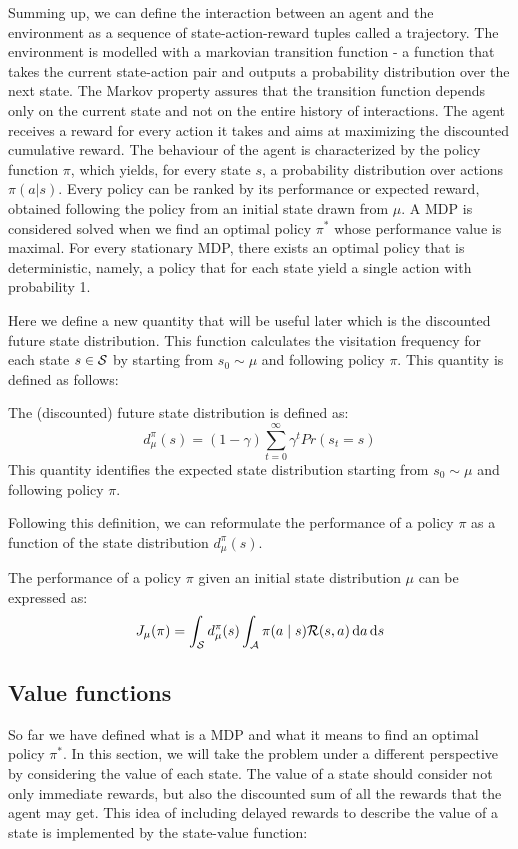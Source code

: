 Summing up, we can define the interaction between an agent and the environment as a sequence of state-action-reward tuples called a trajectory. The environment is modelled with a markovian transition function - a function that takes the current state-action pair and outputs a probability distribution over the next state. The Markov property assures that the transition function depends only on the current state and not on the entire history of interactions. The agent receives a reward for every action it takes and aims at maximizing the discounted cumulative reward. The behaviour of the agent is characterized by the policy function $\pi$, which yields, for every state $s$, a probability distribution over actions $\pi(a|s)$. Every policy can be ranked by its performance or expected reward, obtained following the policy from an initial state drawn from $\mu$. A MDP is considered solved when we find an optimal policy $\pi^*$ whose performance value is maximal. For every stationary MDP, there exists an optimal policy that is deterministic, namely, a policy that for each state yield a single action with probability 1.

Here we define a new quantity that will be useful later which is the discounted future state distribution. This function calculates the visitation frequency for each state $s\in\mathcal{S}$ by starting from $s_0\sim\mu$ and following policy $\pi$. This quantity is defined as follows:
\begin{definition}
The (discounted) future state distribution is defined as: 
\[
d_{\mu}^{\pi}(s) = (1-\gamma)\sum_{t=0}^{\infty} \gamma^t Pr(s_t = s)
\]
This quantity identifies the expected state distribution starting from $s_0 \sim \mu$ and following policy $\pi$. 
\end{definition}

Following this definition, we can reformulate the performance of a policy $\pi$ as a function of the state distribution $d_\mu^\pi(s)$.

\begin{definition}
The performance of a policy $\pi$ given an initial state distribution $\mu$ can be expressed as: 
\begin{equation*}
J_{\mu}(\pi) = \int_{\mathcal{S}} d_{\mu}^{\pi}(s) \int_{\mathcal{A}} \pi(a \mid s) \mathcal{R}(s,a) \, \textrm{d} a \, \textrm{d} s
\end{equation*}
\end{definition}


\subsection{Value functions}
So far we have defined what is a MDP and what it means to find an optimal policy $\pi^*$. In this section, we will take the problem under a different perspective by considering the value of each state. The value of a state should consider not only immediate rewards, but also the discounted sum of all the rewards that the agent may get. This idea of including delayed rewards to describe the value of a state is implemented by the state-value function:

